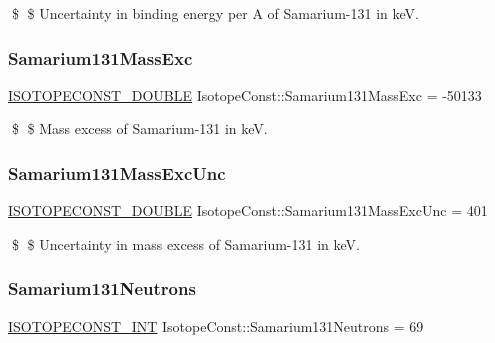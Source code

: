 \$ \$ Uncertainty in binding energy per A of Samarium-\/131 in keV. \mbox{\label{group___isotope_const-_samarium-_sm131_gad113e23c1aacf0f70cefcd386c18e5af}} 
\subsubsection{\texorpdfstring{Samarium131\+Mass\+Exc}{Samarium131MassExc}}
{\footnotesize\ttfamily \mbox{\hyperlink{group___isotope_const-_macros_ga8f45a7272ce02c0b4c65c44636ed719a}{I\+S\+O\+T\+O\+P\+E\+C\+O\+N\+S\+T\+\_\+\+D\+O\+U\+B\+LE}} Isotope\+Const\+::\+Samarium131\+Mass\+Exc = -\/50133}

\$ \$ Mass excess of Samarium-\/131 in keV. \mbox{\label{group___isotope_const-_samarium-_sm131_ga02f5b148d0b1ee740a6dbab57c02b6b0}} 
\subsubsection{\texorpdfstring{Samarium131\+Mass\+Exc\+Unc}{Samarium131MassExcUnc}}
{\footnotesize\ttfamily \mbox{\hyperlink{group___isotope_const-_macros_ga8f45a7272ce02c0b4c65c44636ed719a}{I\+S\+O\+T\+O\+P\+E\+C\+O\+N\+S\+T\+\_\+\+D\+O\+U\+B\+LE}} Isotope\+Const\+::\+Samarium131\+Mass\+Exc\+Unc = 401}

\$ \$ Uncertainty in mass excess of Samarium-\/131 in keV. \mbox{\label{group___isotope_const-_samarium-_sm131_ga23dbef5607ed2a656c8a9b9c4db8d2b5}} 
\subsubsection{\texorpdfstring{Samarium131\+Neutrons}{Samarium131Neutrons}}
{\footnotesize\ttfamily \mbox{\hyperlink{group___isotope_const-_macros_ga5f18360b3e99483a35c32d789e62621c}{I\+S\+O\+T\+O\+P\+E\+C\+O\+N\+S\+T\+\_\+\+I\+NT}} Isotope\+Const\+::\+Samarium131\+Neutrons = 69}

